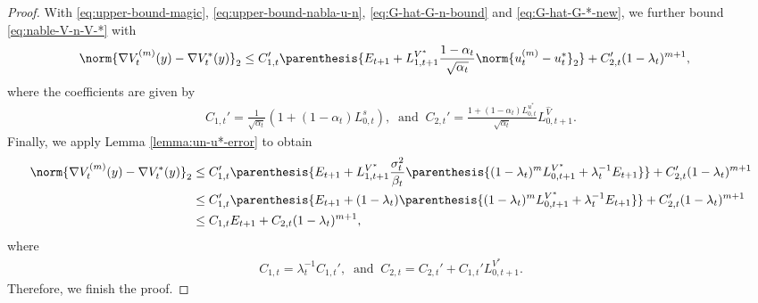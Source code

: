 \documentclass{article}
\begin{document}
\begin{proof}
With \eqref{eq:upper-bound-magic}, \eqref{eq:upper-bound-nabla-u-n}, \eqref{eq:G-hat-G-n-bound} and \eqref{eq:G-hat-G-*-new}, we further bound \eqref{eq:nable-V-n-V-*} with
\begin{align*}
    \norm{\nabla V_{t}^{(m)}(y) -  \nabla V_{t}^{*}(y)}_2 & \leq C_{1, t}'\parenthesis{E_{t+1} + L_{1, t+1}^{V^{*}} \frac{1 - \alpha_{t}}{\sqrt{\alpha_{t}}}\norm{u_{t}^{(m)} - u_{t}^{*}}_2} + C_{2, t}'(1 - \lambda_t)^{m+1}, 
\end{align*}
where the coefficients are given by 
\begin{align*}
    C_{1,t}' = \frac{1}{\sqrt{\alpha_t}}(1 + (1 - \alpha_t)L_{0, t}^{s}), \;\; \text{and} \;\; C_{2, t}' = \frac{1 + (1 - \alpha_{t})L_{0,t}^{u^{*}}}{\sqrt{\alpha_t}}L_{0, t+1}^{\widehat{V}}.
\end{align*}
Finally, we apply Lemma \ref{lemma:un-u*-error} to obtain
\begin{align*}
    \norm{\nabla V_{t}^{(m)}(y) -  \nabla V_{t}^{*}(y)}_2 & \leq C_{1, t}'\parenthesis{E_{t+1} + L_{1, t+1}^{V^*}\frac{\sigma_t^2}{\beta_t}\parenthesis{(1 - \lambda_t)^m  L_{0,t+1}^{V^*} + \lambda_t^{-1}E_{t+1}} } + C_{2, t}'(1 - \lambda_t)^{m+1} \\ & \leq C_{1, t}'\parenthesis{E_{t+1} + (1 - \lambda_t)\parenthesis{(1 - \lambda_t)^m  L_{0,t+1}^{V^*} + \lambda_t^{-1}E_{t+1}} } + C_{2, t}'(1 - \lambda_t)^{m+1}  \\ & \leq C_{1, t}E_{t+1} + C_{2, t}(1 - \lambda_t)^{m+1},
\end{align*}
where 
\begin{align*}
    C_{1,t} = \lambda_t^{-1} C_{1,t}' , \;\; \text{and} \;\; C_{2, t} = C_{2, t}' + C_{1, t}' L_{0, t+1}^{V^*}.
\end{align*}
Therefore, we finish the proof. 
\end{proof}
\end{document}
